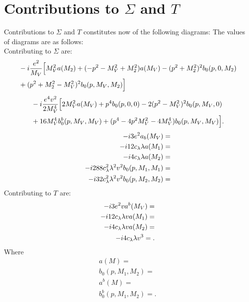\section{Contributions to \texorpdfstring{$\Sigma$}{Sigma} and \texorpdfstring{$T$}{T}}
Contributions to $\Sigma$ and $T$ constitutes now of the following diagrams:
The values of diagrams are as follows: \\
Contributing to $\Sigma$ are:
\begin{align}
&-i\frac{e^2}{M_V}\Big[M_V^2a(M_2)+(-p^2-M_V^2+M_2^2)a(M_V)-(p^2+M_2^2)^2b_0(p,0,M_2) 
\notag\\ 
&+(p^2+M_2^2-M_V^2)^2b_0(p,M_V,M_2)\Big]
\end{align}
\begin{align}
&-i\frac{e^4v^2}{2M_V^4}\Big[2M_V^2a(M_V)+p^4b_0(p,0,0)-2(p^2-M_V^2)^2b_0(p,M_V,0)\notag \\
&+16M_V^4b_0^b(p,M_V,M_V)+(p^4-4p^2M_V^2-4M_V^4)b_0(p,M_V,M_V)\Big].
\end{align}
\begin{align}
-i3e^2a_b(M_V) =\\
-i12c_\lambda\lambda a(M_1) =\\
-i4c_\lambda\lambda a(M_2) =\\
-i288c_\lambda^2\lambda^2v^2b_0(p,M_1,M_1) =\\
-i32c_\lambda^2\lambda^2 v^2b_0(p,M_2,M_2) =\\
\end{align}
Contributing to $T$ are:
\begin{align}
-i3e^2va^b(M_V) =\\
-i12c_\lambda\lambda va(M_1) =\\
-i4c_\lambda\lambda va(M_2) =\\
-i4c_\lambda\lambda v^3 =.
\end{align}
Where
\begin{align}
a(M) = \\
b_0(p,M_1,M_2) = \\
a^b(M) = \\
b_0^b(p,M_1,M_2) = .
\end{align}
